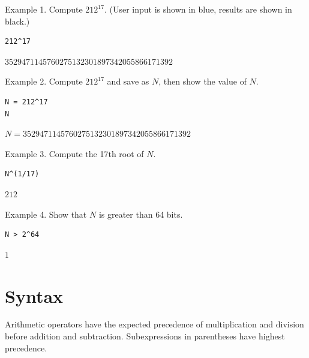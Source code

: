\documentclass[12pt]{article}
\begin{document}
Example 1. Compute $212^{17}$.
(User input is shown in blue, results are shown in black.)

{\color{blue}
\begin{verbatim}
212^17
\end{verbatim}}

$3529471145760275132301897342055866171392$

\bigskip
Example 2. Compute $212^{17}$ and save as $N$,
then show the value of $N$.

{\color{blue}
\begin{verbatim}
N = 212^17
N
\end{verbatim}}

$N=3529471145760275132301897342055866171392$

\bigskip
Example 3. Compute the 17th root of $N$.

{\color{blue}
\begin{verbatim}
N^(1/17)
\end{verbatim}}

$212$

\bigskip
Example 4. Show that $N$ is greater than 64 bits.

{\color{blue}
\begin{verbatim}
N > 2^64
\end{verbatim}}

$1$

\newpage

\section{Syntax}

Arithmetic operators have the expected precedence of
multiplication and division before addition and subtraction.
Subexpressions in parentheses have highest precedence.
\end{document}
